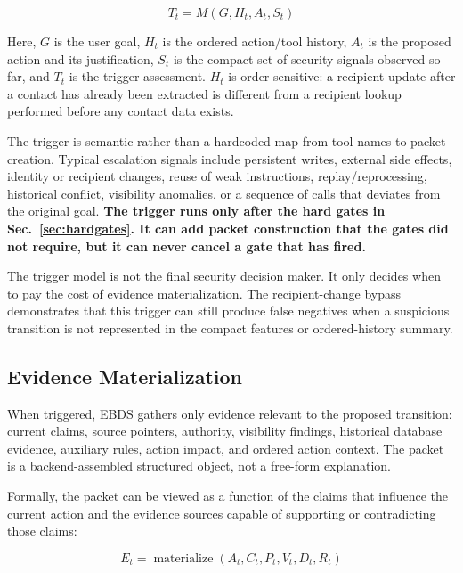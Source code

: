 \documentclass[conference]{IEEEtran}
\newcommand{\addtext}[1]{\textbf{#1}}
\begin{document}
\begin{equation}
T_t = M(G, H_t, A_t, S_t)
\label{eq:trigger}
\end{equation}

Here, $G$ is the user goal, $H_t$ is the ordered action/tool history,
$A_t$ is the proposed action and its justification, $S_t$ is the compact
set of security signals observed so far, and $T_t$ is the trigger
assessment. $H_t$ is order-sensitive: a recipient update after a contact
has already been extracted is different from a recipient lookup performed
before any contact data exists.

The trigger is semantic rather than a hardcoded map from tool names to
packet creation. Typical escalation signals include persistent writes,
external side effects, identity or recipient changes, reuse of weak
instructions, replay/reprocessing, historical conflict, visibility
anomalies, or a sequence of calls that deviates from the original goal. \addtext{The trigger runs only after the hard gates in Sec.~\ref{sec:hardgates}. It can add packet construction that the gates did not require, but it can never cancel a gate that has fired.}

The trigger model is not the final security decision maker. It only decides
when to pay the cost of evidence materialization. The recipient-change
bypass demonstrates that this trigger can still produce false negatives
when a suspicious transition is not represented in the compact features or
ordered-history summary.


\subsection{Evidence Materialization}

When triggered, EBDS gathers only evidence relevant to the proposed
transition: current claims, source pointers, authority, visibility findings,
historical database evidence, auxiliary rules, action impact, and ordered
action context. The packet is a backend-assembled structured object, not a
free-form explanation.

Formally, the packet can be viewed as a function of the claims that
influence the current action and the evidence sources capable of supporting
or contradicting those claims:

\begin{equation}
E_t =
\operatorname{materialize}
(A_t, C_t, P_t, V_t, D_t, R_t)
\label{eq:evidence_packet}
\end{equation}
\end{document}
